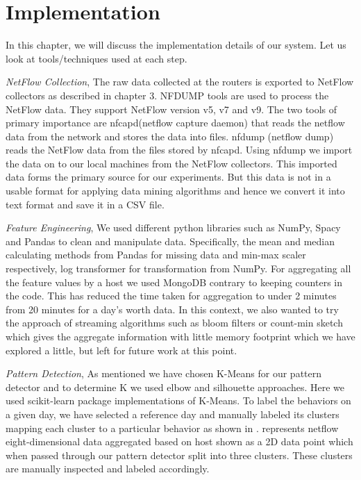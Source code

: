 \label{key}%

\chapter{Implementation}

In this chapter, we will discuss the implementation details of our system. Let us look at tools/techniques used at each step.  

\textit{NetFlow Collection},  The raw data collected at the routers is exported to NetFlow collectors as described in chapter 3. NFDUMP \cite{haag2005watch} tools are used to process the NetFlow data. They support NetFlow version v5, v7 and v9. The two tools of primary importance are nfcapd(netflow capture daemon) that reads the netflow data from the network and stores the data into files. nfdump (netflow dump) reads the NetFlow data from the files stored by nfcapd. Using nfdump we import the data on to our local machines
from the NetFlow collectors. This imported data forms the
primary source for our experiments. But this data is not in a usable format for applying data mining algorithms and hence we convert it into text format and save it in a CSV file.

\textit{Feature Engineering}, We used different python libraries such as NumPy, Spacy and Pandas to clean and manipulate data. Specifically, the mean and median calculating methods from Pandas for missing data and min-max scaler respectively, log transformer for transformation from NumPy. For aggregating all the feature values by a host we used MongoDB contrary to keeping counters in the code. This has reduced the time taken  for aggregation to under 2 minutes from 20 minutes for a day's worth data. In this context, we also wanted to try the approach of streaming algorithms such as bloom filters or count-min sketch which gives the aggregate information with little memory footprint which we have explored a little, but left for future work at this point.

\textit{Pattern Detection}, As mentioned we have chosen K-Means for our pattern detector and to determine K we used elbow and silhouette approaches. Here we used scikit-learn package implementations of K-Means. To label the behaviors on a given day, we have selected a reference day and manually labeled its clusters mapping each cluster to a particular behavior as shown in .  represents netflow eight-dimensional data aggregated based on host shown as a 2D data point which when passed through our pattern detector split into three clusters. These clusters are manually inspected and labeled accordingly.

